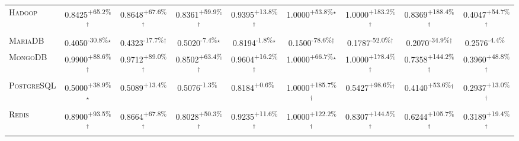 \begin{table}[htbp]
\begin{tabular}{l|cccc|cccc}
\textsc{Hadoop} & \cellcolor{green!30}0.8425\textsuperscript{+65.2\%}$^\dagger$ & \cellcolor{green!30}0.8648\textsuperscript{+67.6\%}$^\dagger$ & \cellcolor{green!30}0.8361\textsuperscript{+59.9\%}$^\dagger$ & \cellcolor{green!30}0.9395\textsuperscript{+13.8\%}$^\dagger$ & \cellcolor{green!30}1.0000\textsuperscript{+53.8\%}$^\star$ & \cellcolor{green!30}1.0000\textsuperscript{+183.2\%}$^\dagger$ & \cellcolor{green!30}0.8369\textsuperscript{+188.4\%}$^\dagger$ & \cellcolor{green!30}0.4047\textsuperscript{+54.7\%}$^\dagger$ \\
\textsc{MariaDB} & \cellcolor{red!30}0.4050\textsuperscript{-30.8\%}$^\star$ & \cellcolor{red!30}0.4323\textsuperscript{-17.7\%}$^\dagger$ & \cellcolor{red!30}0.5020\textsuperscript{-7.4\%}$^\star$ & \cellcolor{red!30}0.8194\textsuperscript{-1.8\%}$^\star$ & \cellcolor{red!30}0.1500\textsuperscript{-78.6\%}$^\dagger$ & \cellcolor{red!30}0.1787\textsuperscript{-52.0\%}$^\dagger$ & \cellcolor{red!30}0.2070\textsuperscript{-34.9\%}$^\dagger$ & \cellcolor{red!30}0.2576\textsuperscript{-4.4\%}$^{\,\,\,}$ \\
\textsc{MongoDB} & \cellcolor{green!30}0.9900\textsuperscript{+88.6\%}$^\dagger$ & \cellcolor{green!30}0.9712\textsuperscript{+89.0\%}$^\dagger$ & \cellcolor{green!30}0.8502\textsuperscript{+63.4\%}$^\dagger$ & \cellcolor{green!30}0.9604\textsuperscript{+16.2\%}$^\dagger$ & \cellcolor{green!30}1.0000\textsuperscript{+66.7\%}$^\star$ & \cellcolor{green!30}1.0000\textsuperscript{+178.4\%}$^\dagger$ & \cellcolor{green!30}0.7358\textsuperscript{+144.2\%}$^\dagger$ & \cellcolor{green!30}0.3960\textsuperscript{+48.8\%}$^\dagger$ \\
\textsc{PostgreSQL} & \cellcolor{green!30}0.5000\textsuperscript{+38.9\%}$^\star$ & \cellcolor{green!30}0.5089\textsuperscript{+13.4\%}$^{\,\,\,}$ & \cellcolor{red!30}0.5076\textsuperscript{-1.3\%}$^{\,\,\,}$ & \cellcolor{green!30}0.8184\textsuperscript{+0.6\%}$^{\,\,\,}$ & \cellcolor{green!30}1.0000\textsuperscript{+185.7\%}$^\dagger$ & \cellcolor{green!30}0.5427\textsuperscript{+98.6\%}$^\dagger$ & \cellcolor{green!30}0.4140\textsuperscript{+53.6\%}$^\dagger$ & \cellcolor{green!30}0.2937\textsuperscript{+13.0\%}$^\dagger$ \\
\textsc{Redis} & \cellcolor{green!30}0.8900\textsuperscript{+93.5\%}$^\dagger$ & \cellcolor{green!30}0.8664\textsuperscript{+67.8\%}$^\dagger$ & \cellcolor{green!30}0.8028\textsuperscript{+50.3\%}$^\dagger$ & \cellcolor{green!30}0.9235\textsuperscript{+11.6\%}$^\dagger$ & \cellcolor{green!30}1.0000\textsuperscript{+122.2\%}$^\dagger$ & \cellcolor{green!30}0.8307\textsuperscript{+144.5\%}$^\dagger$ & \cellcolor{green!30}0.6244\textsuperscript{+105.7\%}$^\dagger$ & \cellcolor{green!30}0.3189\textsuperscript{+19.4\%}$^\dagger$ \\

\end{tabular}
\end{table}
